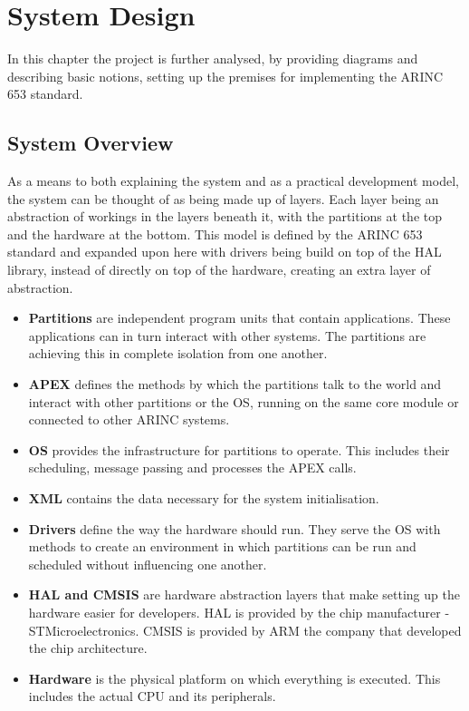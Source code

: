 \chapter{System Design}

In this chapter the project is further analysed, by providing diagrams 
and describing basic notions, setting up the premises for implementing
the ARINC 653 standard.

\section{System Overview}
As a means to both explaining the system and as a practical development
model, the system can be thought of as being made up of layers.
Each layer being an abstraction of workings in the layers beneath it,
with the partitions at the top and the hardware at the bottom.
This model is defined by the ARINC 653 standard
and expanded upon here with drivers being build on top of the HAL library,
instead of directly on top of the hardware,
creating an extra layer of abstraction.

\begin{itemize}
	\item \textbf{Partitions}
		are independent program units that contain applications. These
		applications can in turn interact with other systems. The
		partitions are achieving this  in complete isolation from 
		one another.
	\item \textbf{APEX}
		defines the methods by which the partitions talk to the world and
		interact with other partitions or the OS, running
		on the same core module or connected to other ARINC systems.
	\item \textbf{OS}
		provides the infrastructure for partitions to operate. This 
		includes their scheduling, message passing and processes 
		the APEX calls.
	\item \textbf{XML}
		contains the data necessary for the system initialisation.
	\item \textbf{Drivers}
		define the way the hardware should run.	
		They serve the OS with methods to create an environment in which
		partitions can be run and scheduled without influencing one
		another.
	\item \textbf{HAL and CMSIS}
		are hardware abstraction layers that make setting up the hardware
		easier for developers. HAL is provided by the chip manufacturer - 
		STMicroelectronics. CMSIS is provided by ARM the company that
		developed the chip architecture.
	\item \textbf{Hardware}
		is the physical platform on which everything is executed. This 
		includes the actual CPU and its peripherals.
\end{itemize}



